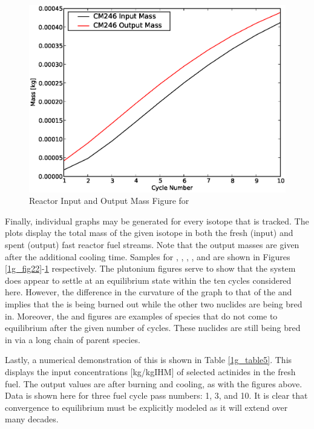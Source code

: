 \begin{figure}[htbp]
\caption{Reactor Input and Output Mass Figure for }
\label{1g_fig26}
\begin{center}
\includegraphics[scale=0.5]{one_group_method/figs/Fig26.eps}
\end{center}
\end{figure}

Finally, individual graphs may be generated for every isotope that is tracked.  
The plots display the total mass of the given isotope in both the fresh (input) and spent (output) 
fast reactor fuel streams.  Note that the output masses are given after the additional cooling time.  
Samples for , , , , and  are shown 
in Figures \ref{1g_fig22}-\ref{1g_fig26} respectively.  The plutonium figures serve to show that the 
system does appear to settle at an equilibrium state within the ten cycles considered here.  
However, the difference in the curvature of the  graph to that of the  and 
 implies that the  is being burned out while the other two nuclides are 
being bred in.  Moreover, the  and  figures are examples of species that 
do not come to equilibrium after the given number of cycles.  These nuclides are still being bred in 
via a long chain of parent species.  

Lastly, a numerical demonstration of this is shown in Table \ref{1g_table5}.  This displays the 
input concentrations [kg/kgIHM] of selected actinides in the fresh fuel.  The output values are 
after burning and cooling, as with the figures above.  Data is shown here for three fuel cycle 
pass numbers: 1, 3, and 10.  It is clear that convergence to equilibrium must be explicitly 
modeled as it will extend over many decades.

